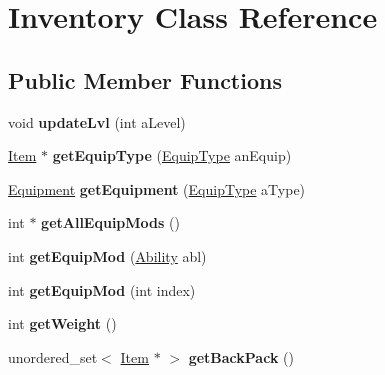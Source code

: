 \hypertarget{class_inventory}{}\section{Inventory Class Reference}
\label{class_inventory}
\subsection*{Public Member Functions}
\begin{DoxyCompactItemize}
\item 
\hypertarget{class_inventory_a804c8fd9e053eece373af66a394c20e6}{}\label{class_inventory_a804c8fd9e053eece373af66a394c20e6} 
void {\bfseries update\+Lvl} (int a\+Level)
\item 
\hypertarget{class_inventory_aaf1dd5cdc379114db88ddb6efb8824ec}{}\label{class_inventory_aaf1dd5cdc379114db88ddb6efb8824ec} 
\hyperlink{class_item}{Item} $\ast$ {\bfseries get\+Equip\+Type} (\hyperlink{class_equip_type}{Equip\+Type} an\+Equip)
\item 
\hypertarget{class_inventory_acc4bbbe2553b7a6dc50ec9e1fe9a3ea2}{}\label{class_inventory_acc4bbbe2553b7a6dc50ec9e1fe9a3ea2} 
\hyperlink{class_equipment}{Equipment} {\bfseries get\+Equipment} (\hyperlink{class_equip_type}{Equip\+Type} a\+Type)
\item 
\hypertarget{class_inventory_a8b886a0ab6b3b14ee3b1a0f3e12155ef}{}\label{class_inventory_a8b886a0ab6b3b14ee3b1a0f3e12155ef} 
int $\ast$ {\bfseries get\+All\+Equip\+Mods} ()
\item 
\hypertarget{class_inventory_a79bf7166e4d63954092137e3ae3c3780}{}\label{class_inventory_a79bf7166e4d63954092137e3ae3c3780} 
int {\bfseries get\+Equip\+Mod} (\hyperlink{class_ability}{Ability} abl)
\item 
\hypertarget{class_inventory_abdaf4c69012ccbece97c87fa169c6648}{}\label{class_inventory_abdaf4c69012ccbece97c87fa169c6648} 
int {\bfseries get\+Equip\+Mod} (int index)
\item 
\hypertarget{class_inventory_a83af81c1871295b5a4e87b8372db577a}{}\label{class_inventory_a83af81c1871295b5a4e87b8372db577a} 
int {\bfseries get\+Weight} ()
\item 
\hypertarget{class_inventory_a666f1f8c42d652235210f8199c586e74}{}\label{class_inventory_a666f1f8c42d652235210f8199c586e74} 
unordered\+\_\+set$<$ \hyperlink{class_item}{Item} $\ast$ $>$ {\bfseries get\+Back\+Pack} ()
\item 
\hypertarget{class_inventory_a8c841bce89b1a4958f22dee158bafccf}{}\label{class_inventory_a8c841bce89b1a4958f22dee158bafccf} 

\end{DoxyCompactItemize}
